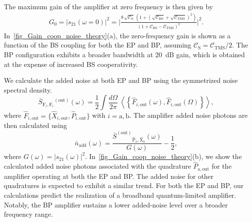 \documentclass[%
reprint,
floatfix,
superscriptaddress,
amsmath,amssymb,
aps,
pra,
]{revtex4-2}
\newcommand*{\scrpt}[1]{\mathrm{#1}}
\newcommand*{\s}[1]{\ensuremath{_\scrpt{#1}}}
\begin{document}
%
The maximum gain of the amplifier at zero frequency is then given by
%
\begin{align}
\label{G0XP}
G\s{0} =  \Big|s\s{21} (\omega=0) \Big|^2 = \Big| \frac{8 \, \sqrt{\mathcal{C}\s{S}} \, \left( 1 + \left(\sqrt{\mathcal{C}\s{BS}} + \sqrt{\mathcal{C}\s{TMS}} \right)^2 \right)}{\left( 1 + \mathcal{C}\s{BS} - \mathcal{C}\s{TMS} \right)^2} \Big|^2.
\end{align}
%
In~\cref{fig_Gain_coop_noise_theory}(a), the zero-frequency gain is shown as a function of the BS coupling for both the EP and BP, assuming $\mathcal{C}\s{S} = \mathcal{C}\s{TMS}/2 $. The BP configuration exhibits a broader bandwidth at 20~dB gain, which is obtained at the expense of increased BS cooperativity.

We calculate the added noise at both EP and BP using the symmetrized noise spectral density.
%
\begin{equation}
    \label{noise_power}
    \bar{S}\s{F_\textit{i},F_\textit{i}}^{\mathrm{(out)}} (\omega) = \frac{1}{2} \int \frac{d \Omega}{2 \pi} \: \left\langle \left\lbrace \hat F\s{\textit{i},out}(\omega), \hat F\s{\textit{i},out}(\Omega) \right\rbrace \right\rangle, 
\end{equation}
%
where $\hat F\s{\textit{i},out} = \lbrace \hat X\s{\textit{i},out} , \hat P\s{\textit{i},out} \rbrace$ with $ i = \mathrm{a},\mathrm{b}$. The amplifier added noise photons are then calculated using
%
\begin{equation}
    \label{naddedw}
    \bar{n}\s{add} (\omega) = \frac{\bar{S}^{\mathrm{(out)}}\s{\hat{P}\s{a},\hat{X}\s{a}} (\omega)}{G(\omega)} - \frac{1}{2},
\end{equation}
%
where $G(\omega)=|s_\mathrm{21}(\omega)|^2$. In~\cref{fig_Gain_coop_noise_theory}(b), we show the calculated added noise photons associated with the quadrature $\hat{P}\s{a,out}$ for the amplifier operating at both the EP and BP. The added noise for other quadratures is expected to exhibit a similar trend. For both the EP and BP, our calculations predict the realization of a broadband quantum-limited amplifier. Notably, the BP amplifier sustains a lower added-noise level over a broader frequency range.

\end{document}

